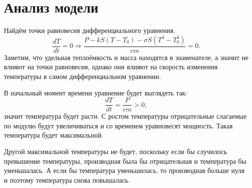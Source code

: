 \section{Анализ модели}
    Найдём точки равновесия дифференциального уравнения.
    \[
        \frac{dT}{dt} = 0 \Rightarrow  \frac{P - k S (T - T_0) - \sigma S (T^4 - T_0^4)}{cm} = 0.
    \]
    Заметим, что удельная теплоёмкость и масса находятся в знаменателе, а значит не влияют на точки равновесия, однако они влияют на скорость изменения температуры в самом дифференциальном уравнении. 

    В начальный момент времени уравнение будет выглядеть так:
    \[
        \frac{dT}{dt} = \frac{P}{cm} > 0,    
    \]
    значит температура будет расти. С ростом температуры отрицательные слагаемые по модулю будут увеличиваться и со временем уравновесят мощность. Такая температура будет максимальной. 

    Другой максимальной температуры не будет, поскольку если бы случилось превышение температуры, производная была бы отрицательная и температура бы уменьшалась. А если бы температура уменьшилась, то производная больше нуля и поэтому температура снова повышалась.
    
    
    

